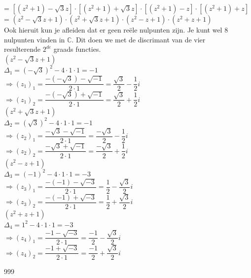 \documentclass[a4paper]{article}
\newcommand{\C}{\mathbb{C}}
\begin{document}
= $[(z^2 + 1) - \sqrt{3}z] \cdot [(z^2 + 1) + \sqrt{3}z] \cdot [(z^2 + 1) - z] \cdot [(z^2 + 1) + z]$\\

= $(z^2 - \sqrt{3}z + 1) \cdot (z^2 + \sqrt{3}z + 1) \cdot (z^2 - z + 1) \cdot (z^2 + z + 1)$\\

Ook hieruit kun je afleiden dat er geen reële nulpunten zijn. Je kunt wel 8\\

nulpunten vinden in $\C$. Dit doen we met de discrimant van de vier\\

resulterende $2^{de}$ graads functies.\\

$(z^2 - \sqrt{3}z + 1)$\\

$\Delta_1 = (-\sqrt{3})^2 - 4 \cdot 1 \cdot 1 = -1$ \\

$\Rightarrow (z_1)_1 = \dfrac{- (-\sqrt{3}) - \sqrt{-1}}{2 \cdot 1} = \dfrac{\sqrt{3}}{2} - \dfrac{1}{2}i$ \\

$\Rightarrow (z_1)_2 = \dfrac{- (-\sqrt{3}) + \sqrt{-1}}{2 \cdot 1} = \dfrac{\sqrt{3}}{2} + \dfrac{1}{2}i$ \\

$(z^2 + \sqrt{3}z + 1)$ \\

$\Delta_2 = (\sqrt{3})^2 - 4 \cdot 1 \cdot 1 = -1$ \\

$\Rightarrow (z_2)_1 = \dfrac{-\sqrt{3} - \sqrt{-1}}{2 \cdot 1} = \dfrac{-\sqrt{3}}{2} - \dfrac{1}{2}i$ \\

$\Rightarrow (z_2)_2 = \dfrac{-\sqrt{3} + \sqrt{-1}}{2 \cdot 1} = \dfrac{-\sqrt{3}}{2} + \dfrac{1}{2}i$ \\

$(z^2 - z + 1)$\\

$\Delta_3 = (-1)^2 - 4 \cdot 1 \cdot 1 = -3$ \\

$\Rightarrow (z_3)_1 = \dfrac{- (-1) - \sqrt{-3}}{2 \cdot 1} = \dfrac{1}{2} - \dfrac{\sqrt{3}}{2}i$ \\

$\Rightarrow (z_3)_2 = \dfrac{- (-1) + \sqrt{-3}}{2 \cdot 1} = \dfrac{1}{2} + \dfrac{\sqrt{3}}{2}i$ \\

$(z^2 + z + 1)$\\

$\Delta_4 = 1^2 - 4 \cdot 1 \cdot 1 = -3$ \\

$\Rightarrow (z_4)_1 = \dfrac{- 1 - \sqrt{-3}}{2 \cdot 1} = \dfrac{-1}{2} - \dfrac{\sqrt{3}}{2}i$ \\

$\Rightarrow (z_4)_2 = \dfrac{- 1 + \sqrt{-3}}{2 \cdot 1} = \dfrac{-1}{2} + \dfrac{\sqrt{3}}{2}i$ \\

\begin{thebibliography}{999}
\end{thebibliography}
\end{document}
